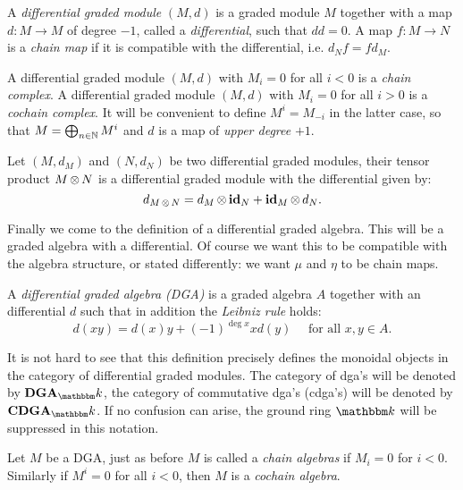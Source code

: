 \begin{definition}
	A \emph{differential graded module} $(M, d)$ is a graded module $M$ together with a map $d: M \to M$ of degree $-1$, called a \emph{differential}, such that $dd = 0$. A map $f: M \to N$ is a \emph{chain map} if it is compatible with the differential, i.e. $d_N f = f d_M$.
\end{definition}

A differential graded module $(M, d)$ with $M_i = 0$ for all $i < 0$ is a \emph{chain complex}. A differential graded module $(M, d)$ with $M_i = 0$ for all $i > 0$ is a \emph{cochain complex}. It will be convenient to define $M^i = M_{-i}$ in the latter case, so that $M = \bigoplus_{n \in \mathbb{N}} M^i$ and $d$ is a map of \emph{upper degree} $+1$.

\begin{definition}
	Let $(M, d_M)$ and $(N, d_N)$ be two differential graded modules, their tensor product $M \operatorname*{\otimes} N$ is a differential graded module with the differential given by:
	$$ d_{M \operatorname*{\otimes} N} = d_M \operatorname*{\otimes} \mathbf{id}_N + \mathbf{id}_M \operatorname*{\otimes} d_N. $$
\end{definition}

Finally we come to the definition of a differential graded algebra. This will be a graded algebra with a differential. Of course we want this to be compatible with the algebra structure, or stated differently: we want $\mu$ and $\eta$ to be chain maps.

\begin{definition}
	A \emph{differential graded algebra (DGA)} is a graded algebra $A$ together with an differential $d$ such that in addition the \emph{Leibniz rule} holds:
	$$ d(xy) = d(x) y + (-1)^{\deg{x}} x d(y) \quad\text{ for all } x, y \in A. $$
\end{definition}


It is not hard to see that this definition precisely defines the monoidal objects in the category of differential graded modules. The category of dga's will be denoted by $\DGA_\k$, the category of commutative dga's (cdga's) will be denoted by $\CDGA_\k$. If no confusion can arise, the ground ring $\k$ will be suppressed in this notation.

Let $M$ be a DGA, just as before $M$ is called a \emph{chain algebras} if $M_i = 0$ for $i < 0$. Similarly if $M^i = 0$ for all $i < 0$, then $M$ is a \emph{cochain algebra}.


